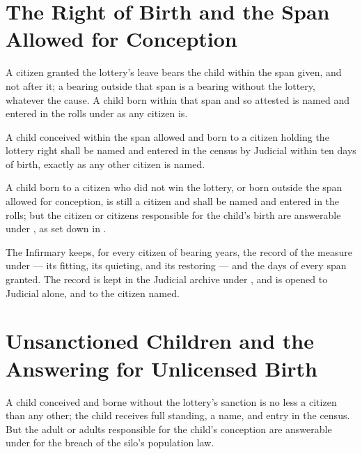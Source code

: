 \section{The Right of Birth and the Span Allowed for Conception}
\label{sec:marriage:right-of-birth-and-the-span-allowed}

A citizen granted the lottery's leave bears the child within the span given, and not after it; a bearing outside that span is a bearing without the lottery, whatever the cause. A child born within that span and so attested is named and entered in the rolls under  as any citizen is.

\begin{clauses}
\item A child conceived within the span allowed and born to a citizen holding the lottery right shall be named and entered in the census by Judicial within ten days of birth, exactly as any other citizen is named.
\item A child born to a citizen who did not win the lottery, or born outside the span allowed for conception, is still a citizen and shall be named and entered in the rolls; but the citizen or citizens responsible for the child's birth are answerable under , as set down in .
\item The Infirmary keeps, for every citizen of bearing years, the record of the measure under  --- its fitting, its quieting, and its restoring --- and the days of every span granted. The record is kept in the Judicial archive under , and is opened to Judicial alone, and to the citizen named.
\end{clauses}

\section{Unsanctioned Children and the Answering for Unlicensed Birth}
\label{sec:marriage:unsanctioned-children-and-the-answering-for-unlicensed-birth}

A child conceived and borne without the lottery's sanction is no less a citizen than any other; the child receives full standing, a name, and entry in the census. But the adult or adults responsible for the child's conception are answerable under  for the breach of the silo's population law.

